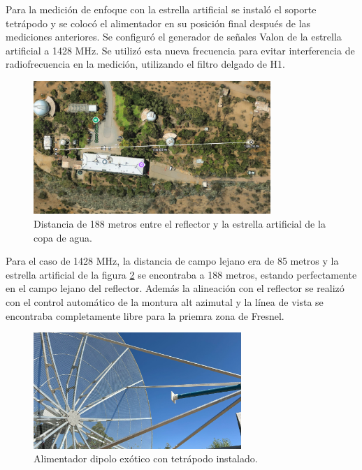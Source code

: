 Para la medición de enfoque con la estrella artificial se instaló el soporte tetrápodo y se colocó el alimentador en su posición final después de las mediciones anteriores. Se configuró el generador de señales Valon de la estrella artificial a 1428 MHz. Se utilizó esta nueva frecuencia para evitar interferencia de radiofrecuencia en la medición, utilizando el filtro delgado de H1.\\

\begin{figure}
    \centering
    \includegraphics[width=0.8\textwidth]{img/188m_measure}
    \caption{Distancia de 188 metros entre el reflector y la estrella artificial de la copa de agua.}
    \label{fig:enfoque2}
\end{figure}

Para el caso de 1428 MHz, la distancia de campo lejano era de 85 metros y la estrella artificial de la figura \ref{fig:enfoque2} se encontraba a 188 metros, estando perfectamente en el campo lejano del reflector. Además la alineación con el reflector se realizó con el control automático de la montura alt azimutal y la línea de vista se encontraba completamente libre para la priemra zona de Fresnel.\\

\begin{figure}
    \centering
    \includegraphics[width=0.7\textwidth]{img/feed_focus}
    \caption{Alimentador dipolo exótico con tetrápodo instalado.}
    \label{fig:enfoque2}
\end{figure}

